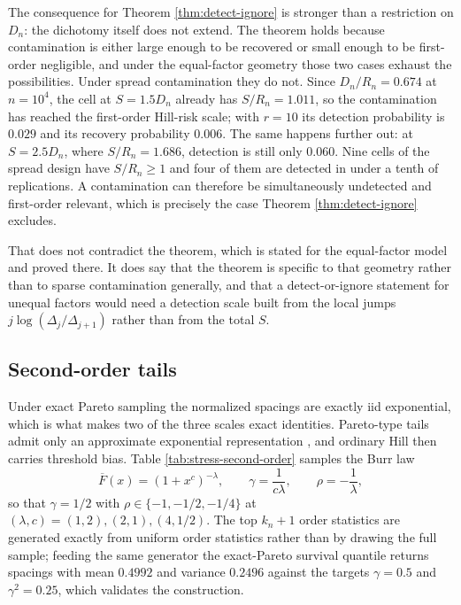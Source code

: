\documentclass[11pt]{article}
\begin{document}
The consequence for Theorem \ref{thm:detect-ignore} is stronger than a
restriction on $D_n$: the dichotomy itself does not extend.  The theorem holds
because contamination is either large enough to be recovered or small enough to
be first-order negligible, and under the equal-factor geometry those two cases
exhaust the possibilities.  Under spread contamination they do not.  Since
$D_n/R_n=0.674$ at $n=10^4$, the cell at $S=1.5D_n$ already has $S/R_n=1.011$,
so the contamination has reached the first-order Hill-risk scale; with $r=10$
its detection probability is $0.029$ and its recovery probability $0.006$.  The
same happens further out: at $S=2.5D_n$, where $S/R_n=1.686$, detection is
still only $0.060$.  Nine cells of the spread design have $S/R_n\ge1$ and four
of them are detected in under a tenth of replications.  A contamination can
therefore be simultaneously undetected and first-order relevant, which is
precisely the case Theorem \ref{thm:detect-ignore} excludes.

That does not contradict the theorem, which is stated for the equal-factor
model and proved there.  It does say that the theorem is specific to that
geometry rather than to sparse contamination generally, and that a
detect-or-ignore statement for unequal factors would need a detection scale
built from the local jumps $j\log(\Delta_j/\Delta_{j+1})$ rather than from the
total $S$.



\FloatBarrier

\subsection{Second-order tails}

Under exact Pareto sampling the normalized spacings are exactly iid
exponential, which is what makes two of the three scales exact identities.
Pareto-type tails admit only an approximate exponential representation
\citep{beirlant-dierckx-guillou-starica-2002}, and ordinary Hill then carries
threshold bias.  Table \ref{tab:stress-second-order} samples the Burr law
\[
  \overline F(x)=(1+x^{c})^{-\lambda},
  \qquad
  \gamma=\frac1{c\lambda},
  \qquad
  \rho=-\frac1\lambda,
\]
so that $\gamma=1/2$ with $\rho\in\{-1,-1/2,-1/4\}$ at
$(\lambda,c)=(1,2),(2,1),(4,1/2)$.  The top $k_n+1$ order statistics are
generated exactly from uniform order statistics rather than by drawing the full
sample; feeding the same generator the exact-Pareto survival quantile returns
spacings with mean $0.4992$ and variance $0.2496$ against the targets
$\gamma=0.5$ and $\gamma^2=0.25$, which validates the construction.
\end{document}
